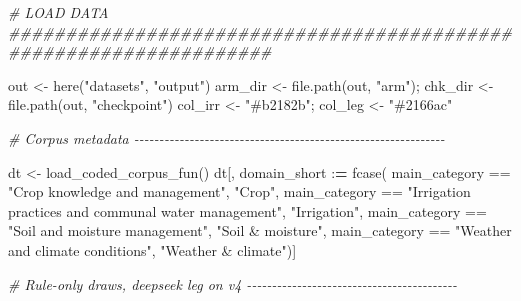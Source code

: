 \documentclass[
  11pt,
]{article}
\newenvironment{Shaded}{\begin{snugshade}}{\end{snugshade}}
\newcommand{\CommentTok}[1]{\textcolor[rgb]{0.56,0.35,0.01}{\textit{#1}}}
\newcommand{\ErrorTok}[1]{\textcolor[rgb]{0.64,0.00,0.00}{\textbf{#1}}}
\newcommand{\FunctionTok}[1]{\textcolor[rgb]{0.00,0.00,0.00}{#1}}
\newcommand{\NormalTok}[1]{#1}
\newcommand{\OtherTok}[1]{\textcolor[rgb]{0.56,0.35,0.01}{#1}}
\newcommand{\SpecialCharTok}[1]{\textcolor[rgb]{0.00,0.00,0.00}{#1}}
\newcommand{\StringTok}[1]{\textcolor[rgb]{0.31,0.60,0.02}{#1}}
\begin{document}
\begin{Shaded}
\begin{Highlighting}[]
\CommentTok{\# LOAD DATA \#\#\#\#\#\#\#\#\#\#\#\#\#\#\#\#\#\#\#\#\#\#\#\#\#\#\#\#\#\#\#\#\#\#\#\#\#\#\#\#\#\#\#\#\#\#\#\#\#\#\#\#\#\#\#\#\#\#\#\#\#\#\#\#\#\#\#}

\NormalTok{out }\OtherTok{\textless{}{-}} \FunctionTok{here}\NormalTok{(}\StringTok{"datasets"}\NormalTok{, }\StringTok{"output"}\NormalTok{)}
\NormalTok{arm\_dir }\OtherTok{\textless{}{-}} \FunctionTok{file.path}\NormalTok{(out, }\StringTok{"arm"}\NormalTok{); chk\_dir }\OtherTok{\textless{}{-}} \FunctionTok{file.path}\NormalTok{(out, }\StringTok{"checkpoint"}\NormalTok{)}
\NormalTok{col\_irr }\OtherTok{\textless{}{-}} \StringTok{"\#b2182b"}\NormalTok{; col\_leg }\OtherTok{\textless{}{-}} \StringTok{"\#2166ac"}

\CommentTok{\# Corpus metadata {-}{-}{-}{-}{-}{-}{-}{-}{-}{-}{-}{-}{-}{-}{-}{-}{-}{-}{-}{-}{-}{-}{-}{-}{-}{-}{-}{-}{-}{-}{-}{-}{-}{-}{-}{-}{-}{-}{-}{-}{-}{-}{-}{-}{-}{-}{-}{-}{-}{-}{-}{-}{-}{-}{-}{-}{-}{-}{-}{-}{-}{-}}

\NormalTok{dt }\OtherTok{\textless{}{-}} \FunctionTok{load\_coded\_corpus\_fun}\NormalTok{()}
\NormalTok{dt[, domain\_short }\SpecialCharTok{:}\ErrorTok{=} \FunctionTok{fcase}\NormalTok{(}
\NormalTok{  main\_category }\SpecialCharTok{==} \StringTok{"Crop knowledge and management"}\NormalTok{, }\StringTok{"Crop"}\NormalTok{,}
\NormalTok{  main\_category }\SpecialCharTok{==} \StringTok{"Irrigation practices and communal water management"}\NormalTok{, }\StringTok{"Irrigation"}\NormalTok{,}
\NormalTok{  main\_category }\SpecialCharTok{==} \StringTok{"Soil and moisture management"}\NormalTok{, }\StringTok{"Soil \& moisture"}\NormalTok{,}
\NormalTok{  main\_category }\SpecialCharTok{==} \StringTok{"Weather and climate conditions"}\NormalTok{, }\StringTok{"Weather \& climate"}\NormalTok{)]}

\CommentTok{\# Rule{-}only draws, deepseek leg on v4 {-}{-}{-}{-}{-}{-}{-}{-}{-}{-}{-}{-}{-}{-}{-}{-}{-}{-}{-}{-}{-}{-}{-}{-}{-}{-}{-}{-}{-}{-}{-}{-}{-}{-}{-}{-}{-}{-}{-}{-}{-}{-}}


\end{Highlighting}
\end{Shaded}
\end{document}
